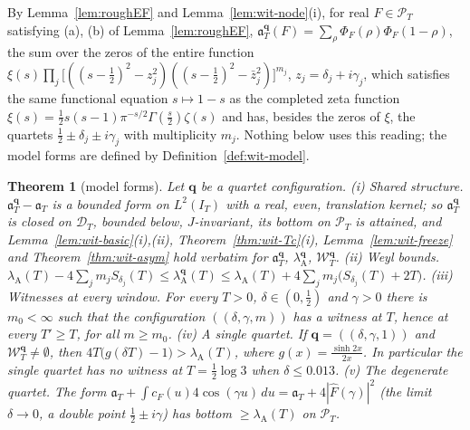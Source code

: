 \documentclass[11pt]{amsart}
\newtheorem{theorem}{Theorem}[section]
\theoremstyle{definition}
\theoremstyle{remark}
\newcommand{\PT}{\mathcal P_T}
\newcommand{\IT}{I_T}
\newcommand{\lamA}{\lambda_{\mathrm A}(T)}
\newcommand{\Fh}{\widehat F}
\newcommand{\cF}{c_F}
\begin{document}
By Lemma~\ref{lem:roughEF} and Lemma~\ref{lem:wit-node}(i), for real $F\in\PT$ satisfying (a), (b) of
Lemma~\ref{lem:roughEF}, $\mathfrak a^{\mathbf q}_T(F)=\sum_\rho\Phi_F(\rho)\Phi_F(1-\rho)$, the sum over the zeros of the entire
function $\xi(s)\prod_j\big[((s-\frac12)^2-z_j^2)((s-\frac12)^2-\bar z_j^2)\big]^{m_j}$, $z_j=\delta_j+i\gamma_j$, which satisfies the
same functional equation $s\mapsto1-s$ as the completed zeta function
$\xi(s)=\frac12s(s-1)\pi^{-s/2}\Gamma(\frac s2)\zeta(s)$ and has, besides the zeros of $\xi$, the quartets
$\frac12\pm\delta_j\pm i\gamma_j$ with multiplicity $m_j$. Nothing below uses this reading; the model forms are defined by
Definition~\ref{def:wit-model}.

\begin{theorem}[model forms]\label{thm:wit-model}
Let $\mathbf q$ be a quartet configuration.
\emph{(i) Shared structure.} $\mathfrak a^{\mathbf q}_T-\mathfrak a_T$ is a bounded form on $L^2(\IT)$ with a real, even, translation
kernel; so $\mathfrak a^{\mathbf q}_T$ is closed on $\mathcal D_T$, bounded below, $J$-invariant, its bottom on $\PT$ is attained, and
Lemma~\ref{lem:wit-basic}(i),(ii), Theorem~\ref{thm:wit-Tc}(i), Lemma~\ref{lem:wit-freeze} and Theorem~\ref{thm:wit-asym}
hold verbatim for $\mathfrak a^{\mathbf q}_T$, $\lambda^{\mathbf q}_{\mathrm A}$, $\mathscr W^{\mathbf q}_T$.
\emph{(ii) Weyl bounds.} $\lamA-4\sum_jm_jS_{\delta_j}(T)\le\lambda^{\mathbf q}_{\mathrm A}(T)\le\lamA+4\sum_jm_j\big(S_{\delta_j}(T)+2T\big)$.
\emph{(iii) Witnesses at every window.} For every $T>0$, $\delta\in(0,\frac12)$ and $\gamma>0$ there is $m_0<\infty$ such that the
configuration $((\delta,\gamma,m))$ has a witness at $T$, hence at every $T'\ge T$, for all $m\ge m_0$.
\emph{(iv) A single quartet.} If $\mathbf q=((\delta,\gamma,1))$ and $\mathscr W^{\mathbf q}_T\ne\emptyset$, then
$4T\big(g(\delta T)-1\big)>\lamA$, where $g(x)=\frac{\sinh2x}{2x}$. In particular the single quartet has no witness at
$T=\frac12\log3$ when $\delta\le0.013$.
\emph{(v) The degenerate quartet.} The form $\mathfrak a_T+\int\cF(u)4\cos(\gamma u)\,du=\mathfrak a_T+4|\Fh(\gamma)|^2$ (the
limit $\delta\to0$, a double point $\frac12\pm i\gamma$) has bottom $\ge\lamA$ on $\PT$.
\end{theorem}
\end{document}
